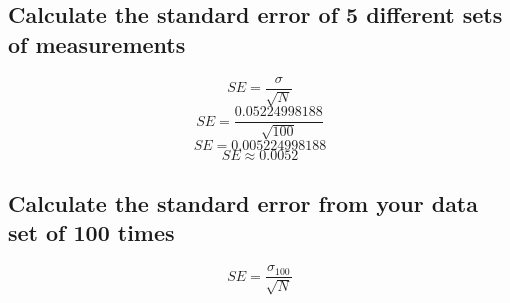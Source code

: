 \documentclass[11pt, letterpaper, includehead]{article}
\begin{document}
  \subsection{Calculate the standard error of 5 different sets of measurements}

  $$SE = \frac{\sigma}{\sqrt{N}}$$
  $$SE = \frac{0.05224998188}{\sqrt{100}}$$
  $$SE = 0.005224998188$$
  $$SE \approx 0.0052$$

  \subsection{Calculate the standard error from your data set of 100 times}

  $$SE = \frac{\sigma_{100}}{\sqrt{N}}$$
  
\end{document}

